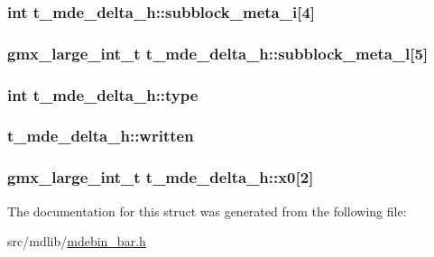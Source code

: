 \hypertarget{structt__mde__delta__h_ab5db9e8595da318aee79eca8d03ebe1d}{
\subsubsection[{subblock\-\_\-meta\-\_\-i}]{\setlength{\rightskip}{0pt plus 5cm}int {\bf t\-\_\-mde\-\_\-delta\-\_\-h\-::subblock\-\_\-meta\-\_\-i}\mbox{[}4\mbox{]}}}\label{structt__mde__delta__h_ab5db9e8595da318aee79eca8d03ebe1d}
\hypertarget{structt__mde__delta__h_aa665adee1793ae203f9ba570d02a557f}{
\subsubsection[{subblock\-\_\-meta\-\_\-l}]{\setlength{\rightskip}{0pt plus 5cm}gmx\-\_\-large\-\_\-int\-\_\-t {\bf t\-\_\-mde\-\_\-delta\-\_\-h\-::subblock\-\_\-meta\-\_\-l}\mbox{[}5\mbox{]}}}\label{structt__mde__delta__h_aa665adee1793ae203f9ba570d02a557f}
\hypertarget{structt__mde__delta__h_aba718075a5fb466a306e34c40d9a4bd3}{
\subsubsection[{type}]{\setlength{\rightskip}{0pt plus 5cm}int {\bf t\-\_\-mde\-\_\-delta\-\_\-h\-::type}}}\label{structt__mde__delta__h_aba718075a5fb466a306e34c40d9a4bd3}
\hypertarget{structt__mde__delta__h_ab3eb64e59847175ce79b437fcd860f89}{
\subsubsection[{written}]{ {\bf t\-\_\-mde\-\_\-delta\-\_\-h\-::written}}}\label{structt__mde__delta__h_ab3eb64e59847175ce79b437fcd860f89}
\hypertarget{structt__mde__delta__h_a57e2a5f530a5623dfdbf071747680d46}{
\subsubsection[{x0}]{\setlength{\rightskip}{0pt plus 5cm}gmx\-\_\-large\-\_\-int\-\_\-t {\bf t\-\_\-mde\-\_\-delta\-\_\-h\-::x0}\mbox{[}2\mbox{]}}}\label{structt__mde__delta__h_a57e2a5f530a5623dfdbf071747680d46}


\-The documentation for this struct was generated from the following file\-:\begin{DoxyCompactItemize}
\item 
src/mdlib/\hyperlink{mdebin__bar_8h}{mdebin\-\_\-bar.\-h}\end{DoxyCompactItemize}
